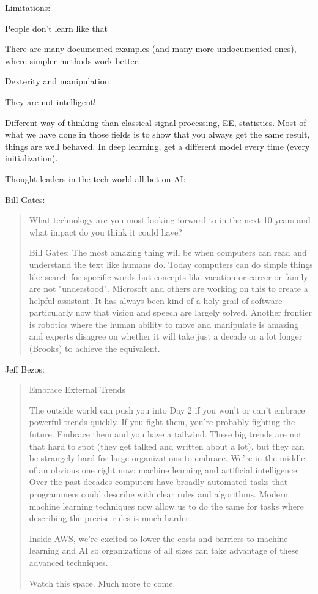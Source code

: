 \documentclass[english]{article}
\begin{document}
\item  Limitations: 

People don't learn like that

There are many documented examples (and many more undocumented ones), where simpler methods work better. 

Dexterity and manipulation 

They are not intelligent!

\item Different way of thinking than classical signal processing, EE, statistics. Most of what we have done in those fields is to show that you always get the same result, things are well behaved. In deep learning, get a different model every time (every initialization).

\item Thought leaders in the tech world all bet on AI: 

Bill Gates:

\begin{quote}
What technology are you most looking forward to in the next 10 years and what impact do you think it could have?

Bill Gates:
The most amazing thing will be when computers can read and understand the text like humans do. Today computers can do simple things like search for specific words but concepts like vacation or career or family are not "understood". Microsoft and others are working on this to create a helpful assistant. It has always been kind of a holy grail of software particularly now that vision and speech are largely solved. Another frontier is robotics where the human ability to move and manipulate is amazing and experts disagree on whether it will take just a decade or a lot longer (Brooks) to achieve the equivalent.
\end{quote}

Jeff Bezos:

\begin{quote}
Embrace External Trends

The outside world can push you into Day 2 if you won't or can't embrace powerful trends quickly. If you fight them, you're probably fighting the future.
Embrace them and you have a tailwind.
These big trends are not that hard to spot (they get talked and written about a lot), but they can be strangely hard for large organizations to embrace. We're in
the middle of an obvious one right now: machine learning and artificial intelligence.
Over the past decades computers have broadly automated tasks that programmers could describe with clear rules and algorithms. Modern machine learning
techniques now allow us to do the same for tasks where describing the precise rules is much harder.


Inside AWS, we're excited to lower the costs and barriers to machine learning and AI so organizations of all sizes can take advantage of these advanced techniques.

Watch this space. Much more to come.
\end{quote}
\end{document}
